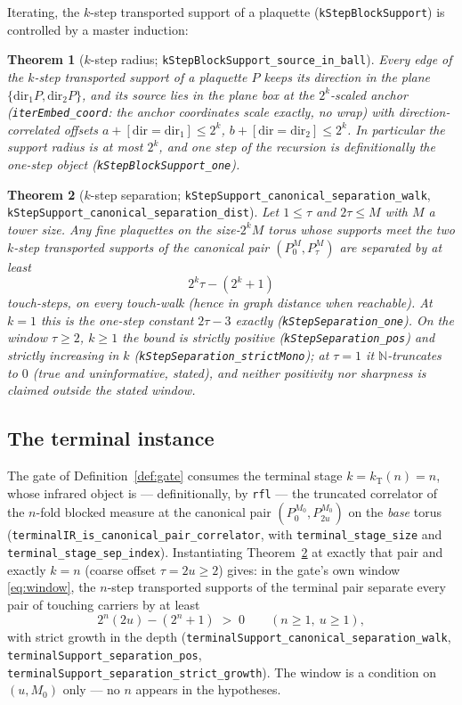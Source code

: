 \documentclass[11pt]{article}
\newtheorem{theorem}{Theorem}[section]
\theoremstyle{definition}
\newcommand{\lean}[1]{\texttt{#1}}
\newcommand{\kT}{k_{\mathrm{T}}}
\begin{document}
Iterating, the $k$-step transported support of a plaquette
(\lean{kStepBlockSupport}) is controlled by a master induction:

\begin{theorem}[$k$-step radius;
\lean{kStepBlockSupport\_source\_in\_ball}]\label{thm:radius}
Every edge of the $k$-step transported support of a plaquette $P$
keeps its direction in the plane $\{ \mathrm{dir}_1 P,
\mathrm{dir}_2 P\}$, and its source lies in the plane box at the
$2^k$-scaled anchor (\lean{iterEmbed\_coord}: the anchor coordinates
scale exactly, no wrap) with direction-correlated offsets
$a + [\mathrm{dir} = \mathrm{dir}_1] \le 2^k$,
$b + [\mathrm{dir} = \mathrm{dir}_2] \le 2^k$.  In particular the
support radius is at most $2^k$, and one step of the recursion is
definitionally the one-step object
(\lean{kStepBlockSupport\_one}).
\end{theorem}

\begin{theorem}[$k$-step separation;
\lean{kStepSupport\_canonical\_separation\_walk},
\lean{kStepSupport\_canonical\_separation\_dist}]\label{thm:ksep}
Let $1 \le \tau$ and $2\tau \le M$ with $M$ a tower size.  Any fine
plaquettes on the size-$2^k M$ torus whose supports meet the two
$k$-step transported supports of the canonical pair
$(P^M_0, P^M_\tau)$ are separated by at least
\[
2^k \tau - (2^k + 1)
\]
touch-steps, on every touch-walk (hence in graph distance when
reachable).  At $k = 1$ this is the one-step constant $2\tau - 3$
exactly (\lean{kStepSeparation\_one}).  On the window $\tau \ge 2$,
$k \ge 1$ the bound is strictly positive
(\lean{kStepSeparation\_pos}) and strictly increasing in $k$
(\lean{kStepSeparation\_strictMono}); at $\tau = 1$ it
$\mathbb{N}$-truncates to $0$ (true and uninformative, stated), and
neither positivity nor sharpness is claimed outside the stated window.
\end{theorem}

\subsection{The terminal instance}

The gate of Definition~\ref{def:gate} consumes the terminal stage
$k = \kT(n) = n$, whose infrared object is --- definitionally, by
\lean{rfl} --- the truncated correlator of the $n$-fold blocked
measure at the canonical pair $(P^{M_0}_0, P^{M_0}_{2u})$ on the
\emph{base} torus (\lean{terminalIR\_is\_canonical\_pair\_correlator},
with \lean{terminal\_stage\_size} and
\lean{terminal\_stage\_sep\_index}).  Instantiating
Theorem~\ref{thm:ksep} at exactly that pair and exactly $k = n$
(coarse offset $\tau = 2u \ge 2$) gives: in the gate's own window
\eqref{eq:window}, the $n$-step transported supports of the terminal
pair separate every pair of touching carriers by at least
\begin{equation}\label{eq:termsep}
2^n (2u) - (2^n + 1) \;>\; 0 \qquad (n \ge 1,\ u \ge 1),
\end{equation}
with strict growth in the depth
(\lean{terminalSupport\_canonical\_separation\_walk},
\lean{terminalSupport\_separation\_pos},
\lean{terminalSupport\_separation\_strict\_growth}).  The window is a
condition on $(u, M_0)$ only --- no $n$ appears in the hypotheses.
\end{document}
